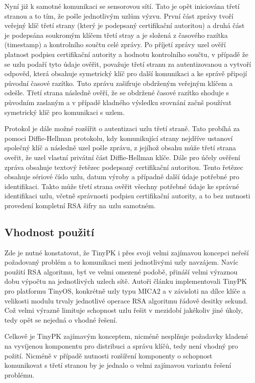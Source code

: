 \documentclass[11pt,final,twoside]{fithesis2}
\begin{document}
Nyní již k samotné komunikaci se sensorovou sítí. Tato je opět iniciována třetí stranou a to tím, že pošle jednotlivým uzlům 
výzvu. První část zprávy tvoří veřejný klíč třetí strany (který je podepsaný certifikační autoritou) a druhá část je podepsána 
soukromým klíčem třetí stray a je složená z časového razítka (timestamp) a kontrolního součtu celé zprávy. Po příjetí zprávy
uzel ověří platnost podpisu certifikační autority a hodnotu kontrolního součtu, v případě že se uzlu podaří tyto údaje ověřit, 
považuje třetí stranu za autentizovanou a vytvoří odpověd, která obsahuje symetrický klíč pro další komunikaci a ke správě připojí 
původní časové razítko. Tuto zprávu zašifruje obdrženým veřejným klíčem a odešle. Třetí strana následně ověří, že se obdržené 
časové razítko shoduje s původním zaslaným a v případě kladného výsledku srovnání začnš používat symetrický klíč pro 
komunikaci s uzlem. 

Protokol je dále možné rozšířit o autentizaci uzlu třetí straně. Tato probíhá za pomoci Diffie-Hellman protokolu\cite{Diffie1976}, 
kdy komunikující strany nejdříve ustanoví společný klíč a následně uzel pošle zprávu, z jejíhož obsahu může třetí strana oveřit,
že uzel vlastní privátní část Diffie-Hellman klíče. Dále pro účely ověření zpráva obsahuje  textový řetězec podepsaný 
certifikační autoritou. Tento řetězec obsahuje sériové číslo uzlu, datum výroby a případně další údaje potřebné pro identifikaci. 
Takto může třetí strana ověřit všechny potřebné údaje ke správné identifikaci uzlu, včetně správnosti podpisu certifikační autority, 
a to bez nutnosti provedení kompletní RSA šifry na uzlu samotném.

\subsection{Vhodnost použití}

Zde je nutné konstatovat, že TinyPK i přes svoji velmi zajímavou koncepci neřeší požadovaný problém a to komunikaci mezi jednotlivými
uzly navzájem. Navíc použití RSA algoritmu, byť ve velmi omezené podobě, přináší velmi výraznou dobu výpočtu na jednotlivých uzlech sítě. 
Autoři článku implementovali TinyPK pro platformu TinyOS, konkrétně uzly typu MICA2\cite{Inc.} a v závisloti na dílce klíče a velikosti modulu
trvaly jednotlivé operace RSA algoritmu řádově desitky sekund. Což velmi výrazně limituje schopnost uzlu řešit v mezidobí jakékoliv jiné úkoly, 
tedy opět se nejedná o vhodné řešení. 

Celkově je TinyPK zajímavým konceptem, nicméně nesplňuje požadavky kladené na vyvíjenou komponentu pro distribuci a správu klíčů, tedy není vhodný 
pro požití. Nicméně v případě nutnosti rozšíření komponenty o schopnost komunikovat s třetí stranou by je jednalo o velmi zajímavou variantu řešení problému.
\end{document}
